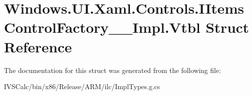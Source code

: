 \hypertarget{struct_windows_1_1_u_i_1_1_xaml_1_1_controls_1_1_i_items_control_factory_____impl_1_1_vtbl}{}\section{Windows.\+U\+I.\+Xaml.\+Controls.\+I\+Items\+Control\+Factory\+\_\+\+\_\+\+Impl.\+Vtbl Struct Reference}
\label{struct_windows_1_1_u_i_1_1_xaml_1_1_controls_1_1_i_items_control_factory_____impl_1_1_vtbl}


The documentation for this struct was generated from the following file\+:\begin{DoxyCompactItemize}
\item 
I\+V\+S\+Calc/bin/x86/\+Release/\+A\+R\+M/ilc/Impl\+Types.\+g.\+cs\end{DoxyCompactItemize}
